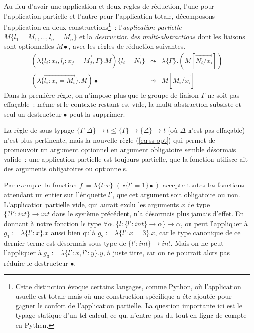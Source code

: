 \documentclass[twoside]{article}
\newcommand{\univ}[2]{\forall #1.~ #2}
\newcommand{\mabs}[2]{\lambda\{#1\}.#2}
\newcommand{\tmabs}[2]{\{#1\}\to #2}
\newcommand{\mapp}[2]{#1\{#2\}}
\renewcommand{\vec}[1]{\overrightarrow{#1}}
\newcommand{\eqdef}{:=}
\theoremstyle{plain}
\theoremstyle{definition}
\theoremstyle{remark}
\begin{document}
Au lieu d'avoir une application et deux règles de réduction, l'une pour
l'application partielle et l'autre pour l'application totale, décomposons
l'application en deux constructions\footnote{Cette distinction évoque certains
  langages, comme Python, où l'application usuelle est totale mais où une
  construction spécifique a été ajoutée pour gagner le confort de l'application
  partielle. La question importante ici est le typage statique d'un tel calcul,
  ce qui n'entre pas du tout en ligne de compte en Python.}~:
l'\emph{application partielle} $\mapp{M}{l_1=M_1,\ldots,l_n=M_n}$ et la
\emph{destruction des multi-abstractions} dont les liaisons sont optionnelles
$M\bullet$, avec les règles de réduction suivantes.
\begin{eqnarray*}
  \mapp{(\mabs{\vec{l_i:x_i,l_j:x_j=M_j},\Gamma}{M})}{\vec{l_i=N_i}}
  &\leadsto&
  \lambda\{\Gamma\}.(M[\vec{N_i/x_i}])
  \\
  (\mabs{\vec{l_i:x_i=M_i}}{M})\bullet
  &\leadsto&
  M[\vec{M_i/x_i}]
\end{eqnarray*}
Dans la première règle, on n'impose plus que le groupe de liaison $\Gamma$ ne
soit pas effaçable~: même si le contexte restant est vide, la multi-abstraction
subsiste et seul un destructeur $\bullet$ peut la supprimer.

La règle de sous-typage $\{ \Gamma, \Delta \}\rightarrow t \leq
\{\Gamma\}\rightarrow\{\Delta\}\rightarrow t$ (où $\Delta$ n'est pas effaçable)
n'est plus pertinente, mais la nouvelle règle (\ref{eq:ss-opt}) qui permet de
promouvoir un argument optionnel en argument obligatoire semble désormais
valide~: une application partielle est toujours partielle, que la fonction
utilisée ait des arguments obligatoires ou optionnels.

Par exemple, la fonction $f\eqdef\mabs{l:x}{(\mapp{x}{l'=1}\bullet)}$ accepte
toutes les fonctions attendant un entier sur l'étiquette $l'$, que cet argument
soit obligatoire ou non. L'application partielle vide, qui aurait exclu les
arguments $x$ de type $\tmabs{?l':int}{int}$ dans le système précédent, n'a
désormais plus jamais d'effet. En donnant à notre fonction le type
$\univ{\alpha}\tmabs{l:\tmabs{l':int}{\alpha}}{\alpha}$, on peut l'appliquer à
$g_1\eqdef\mabs{l':x}{x}$ aussi bien qu'à $g_2\eqdef\mabs{l':x=3}{x}$, car le
type canonique de ce dernier terme est désormais sous-type de
$\tmabs{l':int}{int}$.  Mais on ne peut l'appliquer à
$g_3\eqdef\mabs{l':x,l'':y}{y}$, à juste titre, car on ne pourrait alors pas
réduire le destructeur $\bullet$.
\end{document}
